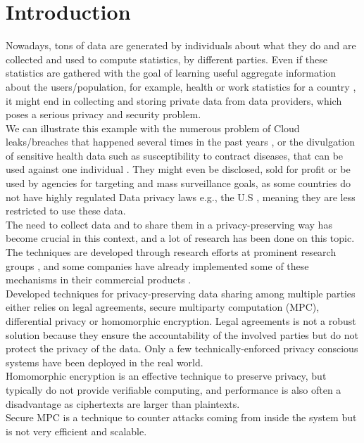 \documentclass{article}
\begin{document}
\section*{Introduction}
Nowadays, tons of data are generated by individuals about what they do and are collected and used to compute statistics, by different parties. Even if these statistics are gathered with the goal of learning useful aggregate information about the users/population, for example, health or work statistics for a country \cite{swiss}, it might end in collecting and storing private data from data providers, which poses a serious privacy and security problem.\\
We can illustrate this example with the numerous problem of Cloud leaks/breaches that happened several times in the past years \cite{pentagon}, or the divulgation of sensitive health data such as susceptibility to contract diseases, that can be used against one individual \cite{sell}. They might even be disclosed, sold for profit \cite{sold} or be used by agencies for targeting and mass surveillance goals, as some countries do not have highly regulated Data privacy laws e.g., the U.S \cite{law}, meaning they are less restricted to use these data.\\
The need to collect data and to share them in a privacy-preserving way has become crucial in this context, and a lot of research has been done on this topic.\\
The techniques are developed through research efforts at prominent research groups \cite{unlynx,prio}, and some companies have already implemented some of these mechanisms in their commercial products \cite{apple}.\\
Developed techniques for privacy-preserving data sharing among multiple parties either relies on legal agreements, secure multiparty computation (MPC), differential privacy or homomorphic encryption.
Legal agreements is not a robust solution because they ensure the accountability of the involved parties but do not protect the privacy of the data. Only a few technically-enforced privacy conscious systems have been deployed in the real world.\\
Homomorphic encryption is an effective technique to preserve privacy, but typically do not provide verifiable computing, and performance is also often a disadvantage as ciphertexts are larger than plaintexts.\\
Secure MPC is a technique to counter attacks coming from inside the system but is not very efficient and scalable.\\
\end{document}
